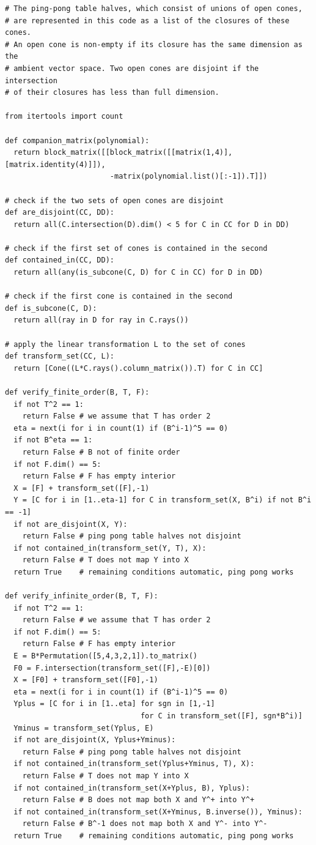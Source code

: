 \documentclass[11pt,a4paper]{amsart}
\theoremstyle{definition}
\theoremstyle{definition}
\numberwithin{equation}{section}
\begin{document}
\vspace{0.5cm}
\small
\begin{verbatim}
# The ping-pong table halves, which consist of unions of open cones,
# are represented in this code as a list of the closures of these cones.
# An open cone is non-empty if its closure has the same dimension as the
# ambient vector space. Two open cones are disjoint if the intersection
# of their closures has less than full dimension.

from itertools import count

def companion_matrix(polynomial):
  return block_matrix([[block_matrix([[matrix(1,4)],[matrix.identity(4)]]),
                        -matrix(polynomial.list()[:-1]).T]])

# check if the two sets of open cones are disjoint
def are_disjoint(CC, DD):
  return all(C.intersection(D).dim() < 5 for C in CC for D in DD)

# check if the first set of cones is contained in the second
def contained_in(CC, DD):
  return all(any(is_subcone(C, D) for C in CC) for D in DD)

# check if the first cone is contained in the second
def is_subcone(C, D):
  return all(ray in D for ray in C.rays())

# apply the linear transformation L to the set of cones
def transform_set(CC, L):
  return [Cone((L*C.rays().column_matrix()).T) for C in CC]

def verify_finite_order(B, T, F):
  if not T^2 == 1:
    return False # we assume that T has order 2
  eta = next(i for i in count(1) if (B^i-1)^5 == 0)
  if not B^eta == 1:
    return False # B not of finite order
  if not F.dim() == 5:
    return False # F has empty interior
  X = [F] + transform_set([F],-1)
  Y = [C for i in [1..eta-1] for C in transform_set(X, B^i) if not B^i == -1]
  if not are_disjoint(X, Y):
    return False # ping pong table halves not disjoint
  if not contained_in(transform_set(Y, T), X):
    return False # T does not map Y into X
  return True    # remaining conditions automatic, ping pong works

def verify_infinite_order(B, T, F):
  if not T^2 == 1:
    return False # we assume that T has order 2
  if not F.dim() == 5:
    return False # F has empty interior
  E = B*Permutation([5,4,3,2,1]).to_matrix()
  F0 = F.intersection(transform_set([F],-E)[0])
  X = [F0] + transform_set([F0],-1)
  eta = next(i for i in count(1) if (B^i-1)^5 == 0)
  Yplus = [C for i in [1..eta] for sgn in [1,-1]
                               for C in transform_set([F], sgn*B^i)]
  Yminus = transform_set(Yplus, E)
  if not are_disjoint(X, Yplus+Yminus):
    return False # ping pong table halves not disjoint
  if not contained_in(transform_set(Yplus+Yminus, T), X):
    return False # T does not map Y into X
  if not contained_in(transform_set(X+Yplus, B), Yplus):
    return False # B does not map both X and Y^+ into Y^+
  if not contained_in(transform_set(X+Yminus, B.inverse()), Yminus):
    return False # B^-1 does not map both X and Y^- into Y^-
  return True    # remaining conditions automatic, ping pong works


\end{verbatim}
\end{document}
